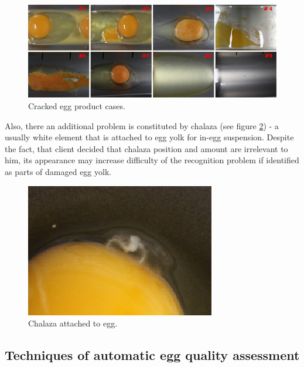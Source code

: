 \documentclass[12pt,twoside,a4paper]{article}
\begin{document}
\begin{figure}[H]
\centering
\includegraphics[width=0.8\paperwidth]{8of9}
\caption{Cracked egg product cases.}\label{fig:8of9}
\end{figure}
\newpage
Also, there an additional problem is constituted by chalaza (see figure \ref{fig:chalaza}) - a usually white element that is attached to egg yolk for in-egg suspension.
Despite the fact, that client decided that chalaza position and amount are irrelevant to him, its appearance may increase difficulty of the recognition problem if identified as parts of damaged egg yolk.

 
\begin{figure}[H]
\centering
\includegraphics[width=0.4\paperwidth]{chalaza}
\caption{Chalaza attached to egg.}\label{fig:chalaza}
\end{figure}


\subsection{Techniques of automatic egg quality assessment}
\end{document}
